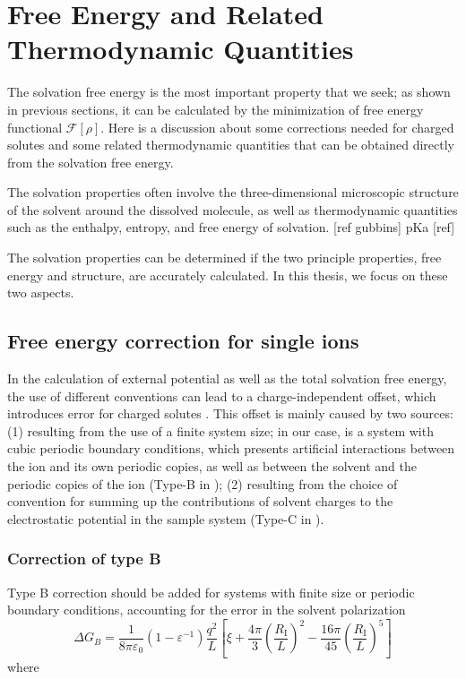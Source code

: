 
\chapter{Free Energy and Related Thermodynamic Quantities\label{chpt:thermodynamic-quantities}}

The solvation free energy is the most important property that we seek;
as shown in previous sections, it can be calculated by the minimization
of free energy functional $\mathcal{F}[\rho]$. Here is a discussion
about some corrections needed for charged solutes and some related
thermodynamic quantities that can be obtained directly from the solvation
free energy.

The solvation properties often involve the three-dimensional microscopic
structure of the solvent around the dissolved molecule, as well as
thermodynamic quantities such as the enthalpy, entropy, and free energy
of solvation. {[}ref gubbins{]} pKa {[}ref{]}

The solvation properties can be determined if the two principle properties,
free energy and structure, are accurately calculated. In this thesis,
we focus on these two aspects.

\section{Free energy correction for single ions}

In the calculation of external potential as well as the total solvation
free energy, the use of different conventions can lead to a charge-independent
offset, which introduces error for charged solutes \citep{Kastenholz_2006_I,Kastenholz_2006_II,Hunenberger_book}.
This offset is mainly caused by two sources: (1) resulting from the
use of a finite system size; in our case, is a system with cubic periodic
boundary conditions, which presents artificial interactions between
the ion and its own periodic copies, as well as between the solvent
and the periodic copies of the ion (Type-B in \citep{Kastenholz_2006_II});
(2) resulting from the choice of convention for summing up the contributions
of solvent charges to the electrostatic potential in the sample system
(Type-C in \citep{Kastenholz_2006_II}).

\subsection{Correction of type B}

Type B correction should be added for systems with finite size or
periodic boundary conditions, accounting for the error in the solvent
polarization 
\begin{equation}
\Delta G_{B}=\frac{1}{8\pi\varepsilon_{0}}\left(1-\varepsilon^{-1}\right)\frac{q^{2}}{L}\left[\xi+\frac{4\pi}{3}\left(\frac{R_{\mathrm{I}}}{L}\right)^{2}-\frac{16\pi}{45}\left(\frac{R_{\mathrm{I}}}{L}\right)^{5}\right]\label{eq:corr-B}
\end{equation}
where

